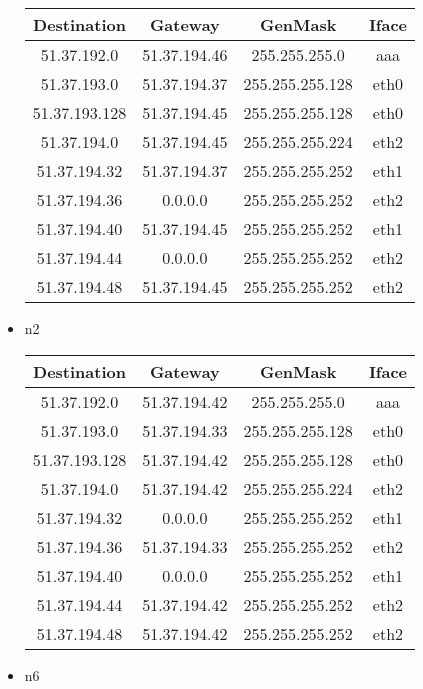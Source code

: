 \documentclass[11pt]{article} %
\begin{document}
\begin{itemize}
            \begin{tabular}{ |c|c|c|c| } 
            \hline
                Destination & Gateway & GenMask & Iface \\
            \hline
                51.37.192.0 & 51.37.194.46 & 255.255.255.0 & aaa \\
                51.37.193.0 & 51.37.194.37 & 255.255.255.128 & eth0 \\
                51.37.193.128 & 51.37.194.45 & 255.255.255.128 & eth0 \\
                51.37.194.0 & 51.37.194.45 & 255.255.255.224 & eth2 \\
                51.37.194.32 & 51.37.194.37 & 255.255.255.252 & eth1 \\
                51.37.194.36 & 0.0.0.0 & 255.255.255.252 & eth2 \\
                51.37.194.40 & 51.37.194.45 & 255.255.255.252 & eth1 \\
                51.37.194.44 & 0.0.0.0 & 255.255.255.252 & eth2 \\
                51.37.194.48 & 51.37.194.45 & 255.255.255.252 & eth2 \\
            \hline
            \end{tabular}
            \item n2
            
            \begin{tabular}{ |c|c|c|c| } 
            \hline
                Destination & Gateway & GenMask & Iface \\
            \hline
                51.37.192.0 & 51.37.194.42 & 255.255.255.0 & aaa \\
                51.37.193.0 & 51.37.194.33 & 255.255.255.128 & eth0 \\
                51.37.193.128 & 51.37.194.42 & 255.255.255.128 & eth0 \\
                51.37.194.0 & 51.37.194.42 & 255.255.255.224 & eth2 \\
                51.37.194.32 & 0.0.0.0 & 255.255.255.252 & eth1 \\
                51.37.194.36 & 51.37.194.33 & 255.255.255.252 & eth2 \\
                51.37.194.40 & 0.0.0.0 & 255.255.255.252 & eth1 \\
                51.37.194.44 & 51.37.194.42 & 255.255.255.252 & eth2 \\
                51.37.194.48 & 51.37.194.42 & 255.255.255.252 & eth2 \\
            \hline
            \end{tabular}
            \item n6
            

\end{itemize}
\end{document}
